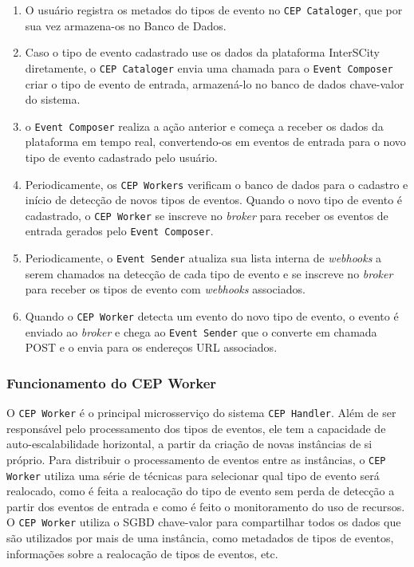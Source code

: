\begin{enumerate}
    \item O usuário registra os metados do tipos de evento no \texttt{CEP Cataloger}, que por sua vez armazena-os no Banco de Dados.
    \item Caso o tipo de evento cadastrado use os dados da plataforma InterSCity diretamente, o \texttt{CEP Cataloger} envia uma chamada para o \texttt{Event Composer} criar o tipo de evento de entrada, armazená-lo no banco de dados chave-valor do sistema.
    \item o \texttt{Event Composer} realiza a ação anterior e começa a receber os dados da plataforma em tempo real, convertendo-os em eventos de entrada para o novo tipo de evento cadastrado pelo usuário.
    \item Periodicamente, os \texttt{CEP Workers} verificam o banco de dados para o cadastro e início de detecção de novos tipos de eventos. Quando o novo tipo de evento é cadastrado, o \texttt{CEP Worker} se inscreve no \textit{broker} para receber os eventos de entrada gerados pelo \texttt{Event Composer}.
    \item Periodicamente, o \texttt{Event Sender} atualiza sua lista interna de \textit{webhooks} a serem chamados na detecção de cada tipo de evento e se inscreve no \textit{broker} para receber os tipos de evento com \textit{webhooks} associados.
    \item Quando o \texttt{CEP Worker} detecta um evento do novo tipo de evento, o evento é enviado ao \textit{broker} e chega ao \texttt{Event Sender} que o converte em chamada POST e o envia para os endereços URL associados.
\end{enumerate}





\subsubsection{Funcionamento do CEP Worker}
\label{sub-sec:cep-worker-func}

O \texttt{CEP Worker} é o principal microsserviço do sistema \texttt{CEP Handler}. Além de ser responsável pelo processamento dos tipos de eventos, ele tem a capacidade de auto-escalabilidade horizontal, a partir da criação de novas instâncias de si próprio. Para distribuir o processamento de eventos entre as instâncias, o \texttt{CEP Worker} utiliza uma série de técnicas para selecionar qual tipo de evento será realocado, como é feita a realocação do tipo de evento sem perda de detecção a partir dos eventos de entrada e como é feito o monitoramento do uso de recursos. O \texttt{CEP Worker} utiliza o SGBD chave-valor para compartilhar todos os dados que são utilizados por mais de uma instância, como metadados de tipos de eventos, informações sobre a realocação de tipos de eventos, etc. 


